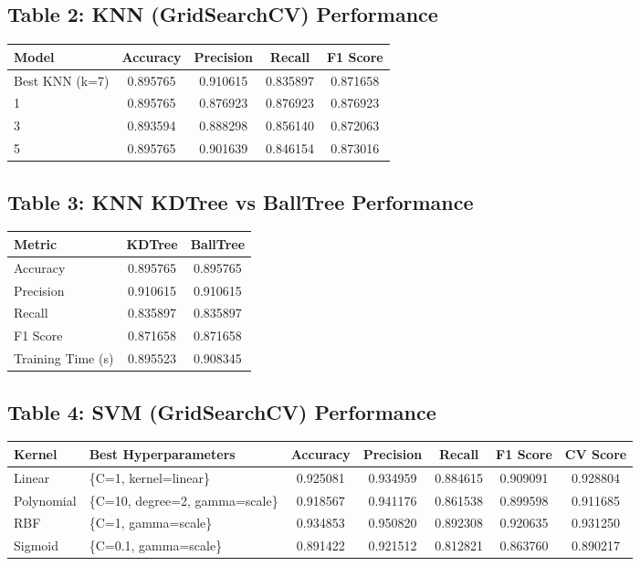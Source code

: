 \documentclass[12pt]{article}
\begin{document}
\subsection*{Table 2: KNN (GridSearchCV) Performance}
\begin{tabular}{|l|c|c|c|c|}
\hline
\textbf{Model} & \textbf{Accuracy} & \textbf{Precision} & \textbf{Recall} & \textbf{F1 Score} \\
\hline
Best KNN (k=7) & 0.895765 & 0.910615 & 0.835897 & 0.871658 \\
1 & 0.895765 & 0.876923 & 0.876923 & 0.876923 \\
3 & 0.893594 & 0.888298 & 0.856140 & 0.872063 \\
5 & 0.895765 & 0.901639 & 0.846154 & 0.873016 \\
\hline
\end{tabular}

\subsection*{Table 3: KNN KDTree vs BallTree Performance}
\begin{tabular}{|l|c|c|}
\hline
\textbf{Metric} & \textbf{KDTree} & \textbf{BallTree} \\
\hline
Accuracy & 0.895765 & 0.895765 \\
Precision & 0.910615 & 0.910615 \\
Recall & 0.835897 & 0.835897 \\
F1 Score & 0.871658 & 0.871658 \\
Training Time (s) & 0.895523 & 0.908345 \\
\hline
\end{tabular}

\subsection*{Table 4: SVM (GridSearchCV) Performance}
\begin{tabular}{|l|l|c|c|c|c|c|}
\hline
\textbf{Kernel} & \textbf{Best Hyperparameters} & \textbf{Accuracy} & \textbf{Precision} & \textbf{Recall} & \textbf{F1 Score} & \textbf{CV Score} \\
\hline
Linear & \{C=1, kernel=linear\} & 0.925081 & 0.934959 & 0.884615 & 0.909091 & 0.928804 \\
Polynomial & \{C=10, degree=2, gamma=scale\} & 0.918567 & 0.941176 & 0.861538 & 0.899598 & 0.911685 \\
RBF & \{C=1, gamma=scale\} & 0.934853 & 0.950820 & 0.892308 & 0.920635 & 0.931250 \\
Sigmoid & \{C=0.1, gamma=scale\} & 0.891422 & 0.921512 & 0.812821 & 0.863760 & 0.890217 \\
\hline
\end{tabular}
\end{document}
